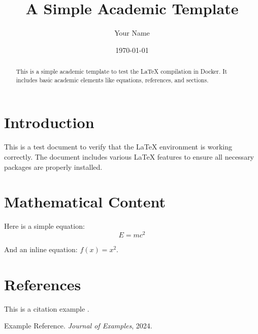 \documentclass[12pt,a4paper]{article}
\title{A Simple Academic Template}
\author{Your Name}
\date{\today}
\begin{document}
\maketitle

\begin{abstract}
This is a simple academic template to test the LaTeX compilation in Docker. It includes basic academic elements like equations, references, and sections.
\end{abstract}

\section{Introduction}
This is a test document to verify that the LaTeX environment is working correctly. The document includes various LaTeX features to ensure all necessary packages are properly installed.

\section{Mathematical Content}
Here is a simple equation:
\begin{equation}
    E = mc^2
\end{equation}

And an inline equation: \( f(x) = x^2 \).

\section{References}
This is a citation example \cite{example}.

\begin{thebibliography}{9}
Example Reference. 
\textit{Journal of Examples}, 2024.
\end{thebibliography}
\end{document}
